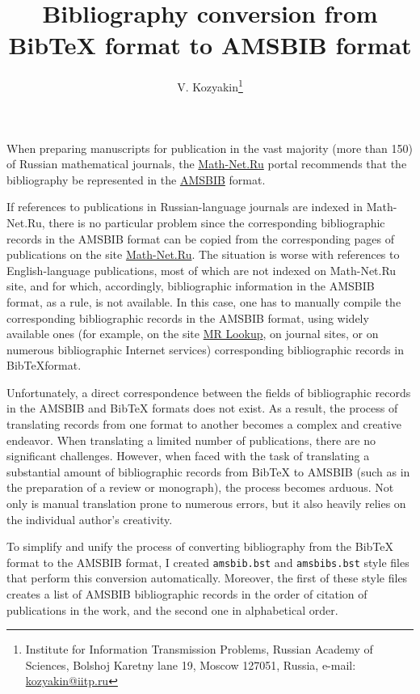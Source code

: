 \documentclass[a4paper]{article}
\title{Bibliography conversion from Bib\TeX{} format to AMSBIB format}
\author{V. Kozyakin\thanks{Institute for Information Transmission Problems, Russian Academy of Sciences, Bolshoj Karetny lane 19, Moscow 127051, Russia,
e-mail: \href{mailto:kozyakin@iitp.ru}{kozyakin@iitp.ru}}}
\begin{document}
\maketitle

When preparing manuscripts for publication in the vast majority (more than 150) of Russian mathematical journals, the \href{https://www.mathnet.ru/index.phtml?&option_lang=eng}{Math-Net.Ru} portal recommends that the bibliography be represented in the \href{https://www.mathnet.ru/poffice/amsbibpackage.phtml?wshow=amsbibpackage&option_lang=eng}{AMSBIB} format.

If references to publications in Russian-language journals are indexed in Math-Net.Ru, there is no particular problem since the corresponding bibliographic records in the AMSBIB format can be copied from the corresponding pages of publications on the site \href{https://www.mathnet.ru/index.phtml?&option_lang=eng}{Math-Net.Ru}. The situation is worse with references to English-language publications, most of which are not indexed on Math-Net.Ru site, and for which, accordingly, bibliographic information in the AMSBIB format, as a rule, is not available. In this case, one has to manually compile the corresponding bibliographic records in the AMSBIB format, using widely available ones (for example, on the site \href{https://mathscinet.ams.org/mrlookup}{MR Lookup}, on journal sites, or on numerous bibliographic Internet services) corresponding bibliographic records in Bib\TeX format.

Unfortunately, a direct correspondence between the fields of bibliographic records in the AMSBIB and Bib\TeX{} formats does not exist. As a result, the process of translating records from one format to another becomes a complex and creative endeavor. When translating a limited number of publications, there are no significant challenges. However, when faced with the task of translating a substantial amount of bibliographic records from Bib\TeX{} to AMSBIB (such as in the preparation of a review or monograph), the process becomes arduous. Not only is manual translation prone to numerous errors, but it also heavily relies on the individual author's creativity.

To simplify and unify the process of converting bibliography from the Bib\TeX{} format to the AMSBIB format, I created \texttt{amsbib.bst} and \texttt{amsbibs.bst} style files that perform this conversion automatically. Moreover, the first of these style files creates a list of AMSBIB bibliographic records in the order of citation of publications in the work, and the second one in alphabetical order.
\end{document}
